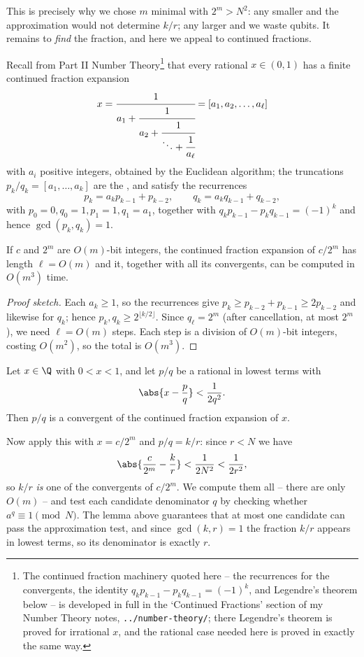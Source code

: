 This is precisely why we chose $m$ minimal with $2^m>N^2$: any smaller and the approximation would not determine $k/r$; any larger and we waste qubits. It remains to \emph{find} the fraction, and here we appeal to continued fractions.

Recall from Part II Number Theory\footnote{The continued fraction machinery quoted here -- the recurrences for the convergents, the identity $q_kp_{k-1}-p_kq_{k-1} = (-1)^k$, and Legendre's theorem below -- is developed in full in the `Continued Fractions' section of my Number Theory notes, \texttt{../number-theory/}; there Legendre's theorem is proved for irrational $x$, and the rational case needed here is proved in exactly the same way.} that every rational $x\in(0,1)$ has a finite continued fraction expansion
$$x = \cfrac{1}{a_1+\cfrac{1}{a_2+\cfrac1{\ddots+\cfrac1{a_\ell}}}} = [a_1,a_2,\dots,a_\ell]$$
with $a_i$ positive integers, obtained by the Euclidean algorithm; the truncations $p_k/q_k = [a_1,\dots,a_k]$ are the , and satisfy the recurrences
$$p_k = a_kp_{k-1}+p_{k-2}, \qquad q_k = a_kq_{k-1}+q_{k-2},$$
with $p_0 = 0, q_0 = 1, p_1 = 1, q_1 = a_1$, together with $q_kp_{k-1}-p_kq_{k-1} = (-1)^k$ and hence $\gcd(p_k,q_k)=1$.

\begin{theorem}
	If $c$ and $2^m$ are $O(m)$-bit integers, the continued fraction expansion of $c/2^m$ has length $\ell = O(m)$ and it, together with all its convergents, can be computed in $O(m^3)$ time.
\end{theorem}

\begin{proof}[Proof sketch]
	Each $a_k\geq1$, so the recurrences give $p_k\geq p_{k-2}+p_{k-1}\geq2p_{k-2}$ and likewise for $q_k$; hence $p_k,q_k\geq2^{\lfloor k/2\rfloor}$. Since $q_\ell = 2^m$ (after cancellation, at most $2^m$), we need $\ell = O(m)$ steps. Each step is a division of $O(m)$-bit integers, costing $O(m^2)$, so the total is $O(m^3)$.
\end{proof}

\begin{theorem}[Legendre]
	Let $x\in\Q$ with $0<x<1$, and let $p/q$ be a rational in lowest terms with
	$$\abs{x - \frac pq}<\frac1{2q^2}.$$
	Then $p/q$ is a convergent of the continued fraction expansion of $x$.
\end{theorem}

Now apply this with $x = c/2^m$ and $p/q = k/r$: since $r<N$ we have
$$\abs{\frac c{2^m}-\frac kr}<\frac1{2N^2}<\frac1{2r^2},$$
so $k/r$ \emph{is} one of the convergents of $c/2^m$. We compute them all -- there are only $O(m)$ -- and test each candidate denominator $q$ by checking whether $a^q\equiv1\pmod N$. The lemma above guarantees that at most one candidate can pass the approximation test, and since $\gcd(k,r)=1$ the fraction $k/r$ appears in lowest terms, so its denominator is exactly $r$.

